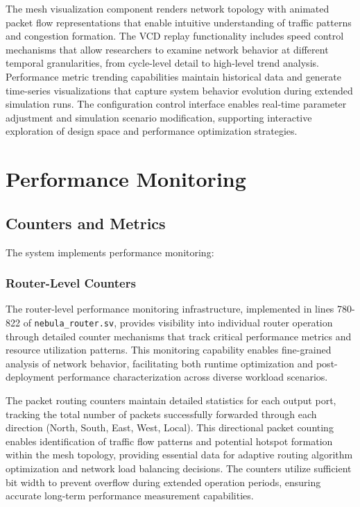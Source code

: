 \documentclass[12pt,letterpaper]{article}
\begin{document}
The mesh visualization component renders network topology with animated packet flow representations that enable intuitive understanding of traffic patterns and congestion formation. The VCD replay functionality includes speed control mechanisms that allow researchers to examine network behavior at different temporal granularities, from cycle-level detail to high-level trend analysis. Performance metric trending capabilities maintain historical data and generate time-series visualizations that capture system behavior evolution during extended simulation runs. The configuration control interface enables real-time parameter adjustment and simulation scenario modification, supporting interactive exploration of design space and performance optimization strategies.

\section{Performance Monitoring}

\subsection{Counters and Metrics}

The system implements performance monitoring:

\subsubsection{Router-Level Counters}

The router-level performance monitoring infrastructure, implemented in lines 780-822 of \texttt{nebula\_router.sv}, provides visibility into individual router operation through detailed counter mechanisms that track critical performance metrics and resource utilization patterns. This monitoring capability enables fine-grained analysis of network behavior, facilitating both runtime optimization and post-deployment performance characterization across diverse workload scenarios.

The packet routing counters maintain detailed statistics for each output port, tracking the total number of packets successfully forwarded through each direction (North, South, East, West, Local). This directional packet counting enables identification of traffic flow patterns and potential hotspot formation within the mesh topology, providing essential data for adaptive routing algorithm optimization and network load balancing decisions. The counters utilize sufficient bit width to prevent overflow during extended operation periods, ensuring accurate long-term performance measurement capabilities.
\end{document}

